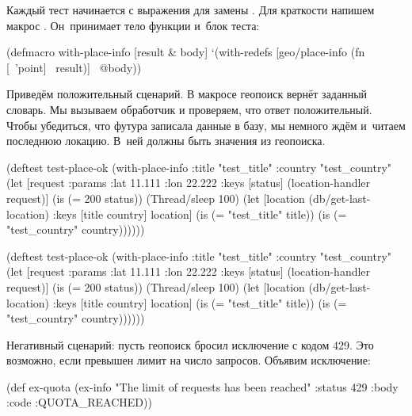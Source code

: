 Каждый тест начинается с выражения  для замены
. Для краткости напишем макрос
. Он~принимает тело функции и~блок теста:

\begin{clojure}
(defmacro with-place-info
  [result & body]
  `(with-redefs [geo/place-info
                 (fn [~'point] ~result)]
     ~@body))
\end{clojure}

Приведём положительный сценарий. В макросе  геопоиск
вернёт заданный словарь. Мы вызываем обработчик и проверяем, что ответ
положительный. Чтобы убедиться, что футура записала данные в базу, мы немного
ждём и~читаем последнюю локацию. В~ней должны быть значения из геопоиска.

\ifnarrow

\begin{clojure}
(deftest test-place-ok
  (with-place-info
    {:title "test_title"
     :country "test_country"}
    (let [request {:params
                   {:lat 11.111
                    :lon 22.222}}
          {:keys [status]}
          (location-handler request)]
      (is (= 200 status))
      (Thread/sleep 100)
      (let [location
            (db/get-last-location)
            {:keys [title country]}
            location]
        (is (= "test_title" title))
        (is (= "test_country"
               country))))))
\end{clojure}

\else

\begin{clojure}
(deftest test-place-ok
  (with-place-info
    {:title "test_title"
     :country "test_country"}
    (let [request {:params {:lat 11.111 :lon 22.222}}
          {:keys [status]} (location-handler request)]
      (is (= 200 status))
      (Thread/sleep 100)
      (let [location (db/get-last-location)
            {:keys [title country]} location]
        (is (= "test_title" title))
        (is (= "test_country" country))))))
\end{clojure}

\fi


Негативный сценарий: пусть геопоиск бросил исключение с кодом 429. Это
возможно, если превышен лимит на число запросов. Объявим исключение:

\ifnarrow

\begin{clojure}
(def ex-quota
  (ex-info
    "The limit of requests
               has been reached"
    {:status 429
     :body {:code :QUOTA_REACHED}}))
\end{clojure}

